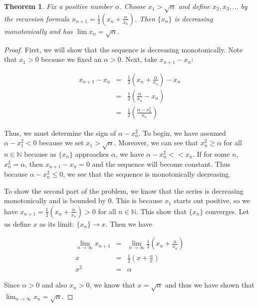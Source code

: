 \documentclass[psamsfonts]{amsart}
\newtheorem{thm}{Theorem}[section]
\theoremstyle{definition}
\theoremstyle{remark}
\numberwithin{equation}{section}
\begin{document}
\begin{thm}
Fix a positive number $\alpha$. Choose $x_1 > \sqrt{\alpha}$ and define $x_2,x_3,\ldots$ by the recursion formula $x_{n+1} = \frac{1}{2} \left( x_n + \frac{\alpha}{x_n} \right)$. Then $\{ x_n \}$ is decreasing monotonically and has $\lim x_n = \sqrt{\alpha}$.
\end{thm}

\begin{proof}
First, we will show that the sequence is decreasing monotonically. Note that $x_1 > 0$ because we fixed an $\alpha > 0 $. Next, take $x_{n+1} - x_n$:

\begin{eqnarray}
x_{n+1} - x_n &=& \frac{1}{2} \left( x_n + \frac{\alpha}{x_n} \right) - x_n \\
&=& \frac{1}{2} \left( \frac{\alpha}{x_n} - x_n \right) \\
&=& \frac{1}{2} \left( \frac{\alpha - x_n^2}{x_n} \right)
\end{eqnarray}

Thus, we must determine the sign of $\alpha - x_n^2$. To begin, we have assumed $\alpha - x_1^2 < 0$ because we set $x_1 > \sqrt{\alpha}$. Moreover, we can see that $x_n^2 \geq \alpha$ for all $n \in \mathbb{N}$ because as $\{ x_n \}$ approaches $\alpha$, we have $\alpha - x_n^2 << x_n$. If for some $n$, $x_n^2 = \alpha$, then $x_{n+1} - x_n = 0$ and the sequence will become constant. Thus because $\alpha - x_n^2 \leq 0$, we see that the sequence is monotonically decreasing. 

To show the second part of the problem, we know that the series is decreasing monotonically and is bounded by $0$. This is because $x_1$ starts out positive, so we have $x_{n+1} = \frac{1}{2} \left( x_n + \frac{\alpha}{x_n} \right) > 0$ for all $n \in \mathbb{N}$. This show that $\{ x_n \}$ converges. Let us define $x$ as its limit: $\{ x_n \} \rightarrow x$. Then we have

\begin{eqnarray}
\lim_{n \to \infty} x_{n+1} &=& \lim_{n \to \infty} \frac{1}{2} \left( x_n + \frac{\alpha}{x_n} \right) \\
x &=& \frac{1}{2} \left( x + \frac{\alpha}{x} \right) \\
x^2 &=& \alpha
\end{eqnarray}

Since $\alpha > 0$ and also $x_n > 0$, we know that $x = \sqrt{\alpha}$ and thus we have shown that $\lim_{n \to \infty} x_n = \sqrt{\alpha}$. 
 
\end{proof}
\end{document}

